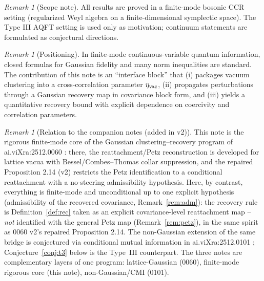 \documentclass[11pt]{article}
\theoremstyle{remark}
\newtheorem{remark}[theorem]{Remark}
\begin{document}
\begin{remark}[Scope note]
All results are proved in a finite-mode bosonic CCR setting (regularized
Weyl algebra on a finite-dimensional symplectic space). The Type III AQFT
setting is used only as motivation; continuum statements are formulated as
conjectural directions.
\end{remark}

\begin{remark}[Positioning]
In finite-mode continuous-variable quantum information, closed formulas for
Gaussian fidelity and many norm inequalities are standard. The contribution
of this note is an ``interface block'' that (i) packages vacuum clustering
into a cross-correlation parameter $\eta_{\rm vac}$, (ii) propagates
perturbations through a Gaussian recovery map in covariance block form, and
(iii) yields a quantitative recovery bound with explicit dependence on
coercivity and correlation parameters.
\end{remark}

\begin{remark}[Relation to the companion notes (added in v2)]
\label{rem:companions}
This note is the rigorous finite-mode core of the Gaussian
clustering--recovery program of ai.viXra:2512.0060 \cite{S0060}: there, the
reattachment/Petz reconstruction is developed for lattice vacua with
Bessel/Combes--Thomas collar suppression, and the repaired Proposition 2.14
(v2) restricts the Petz identification to a conditional reattachment with a
no-steering admissibility hypothesis. Here, by contrast, everything is finite-mode and unconditional up to one
explicit hypothesis (admissibility of the recovered covariance,
Remark~\ref{rem:adm}): the recovery rule is Definition~\ref{def:rec} taken
as an explicit covariance-level reattachment map -- \emph{not} identified
with the general Petz map (Remark~\ref{rem:petz}), in the same spirit as
0060 v2's repaired Proposition 2.14. The non-Gaussian
extension of the same bridge is conjectured via conditional mutual
information in ai.viXra:2512.0101 \cite{S0101}; Conjecture~\ref{conj:t3}
below is the Type~III counterpart. The three notes are complementary layers
of one program: lattice-Gaussian (0060), finite-mode rigorous core (this
note), non-Gaussian/CMI (0101).
\end{remark}
\end{document}
